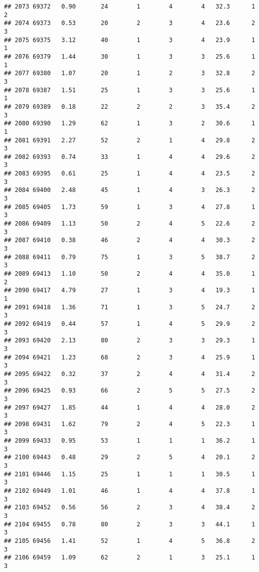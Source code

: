\documentclass[
]{article}
\begin{document}
\begin{verbatim}
## 2073 69372   0.90       24        1        4        4   32.3      1      2
## 2074 69373   0.53       20        2        3        4   23.6      2      3
## 2075 69375   3.12       40        1        3        4   23.9      1      1
## 2076 69379   1.44       30        1        3        3   25.6      1      1
## 2077 69380   1.07       20        1        2        3   32.8      2      3
## 2078 69387   1.51       25        1        3        3   25.6      1      1
## 2079 69389   0.18       22        2        2        3   35.4      2      3
## 2080 69390   1.29       62        1        3        2   30.6      1      1
## 2081 69391   2.27       52        2        1        4   29.8      2      3
## 2082 69393   0.74       33        1        4        4   29.6      2      3
## 2083 69395   0.61       25        1        4        4   23.5      2      3
## 2084 69400   2.48       45        1        4        3   26.3      2      3
## 2085 69405   1.73       59        1        3        4   27.8      1      3
## 2086 69409   1.13       50        2        4        5   22.6      2      3
## 2087 69410   0.38       46        2        4        4   30.3      2      3
## 2088 69411   0.79       75        1        3        5   38.7      2      3
## 2089 69413   1.10       50        2        4        4   35.0      1      2
## 2090 69417   4.79       27        1        3        4   19.3      1      1
## 2091 69418   1.36       71        1        3        5   24.7      2      3
## 2092 69419   0.44       57        1        4        5   29.9      2      3
## 2093 69420   2.13       80        2        3        3   29.3      1      3
## 2094 69421   1.23       68        2        3        4   25.9      1      3
## 2095 69422   0.32       37        2        4        4   31.4      2      3
## 2096 69425   0.93       66        2        5        5   27.5      2      3
## 2097 69427   1.85       44        1        4        4   28.0      2      3
## 2098 69431   1.62       79        2        4        5   22.3      1      3
## 2099 69433   0.95       53        1        1        1   36.2      1      3
## 2100 69443   0.48       29        2        5        4   20.1      2      3
## 2101 69446   1.15       25        1        1        1   30.5      1      3
## 2102 69449   1.01       46        1        4        4   37.8      1      3
## 2103 69452   0.56       56        2        3        4   38.4      2      3
## 2104 69455   0.78       80        2        3        3   44.1      1      3
## 2105 69456   1.41       52        1        4        5   36.8      2      3
## 2106 69459   1.09       62        2        1        3   25.1      1      3

\end{verbatim}
\end{document}
